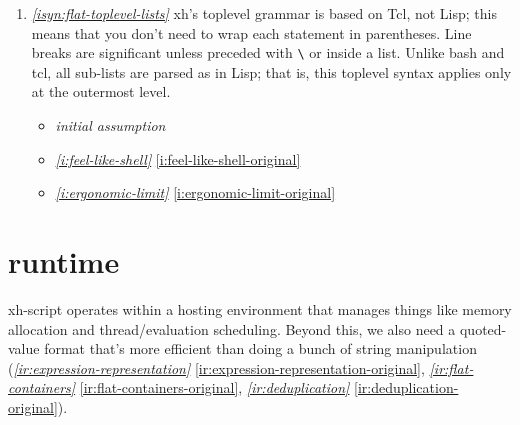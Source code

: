 \documentclass{report}
\makeatletter
\newcommand*{\Label}[2]{%
  \@bsphack
  \begingroup
    \label{#1-original}%
    \def\@currentlabel{#2}%
    \label{#1}%
  \endgroup
  \@esphack
}
\newcommand{\initial}{{\em initial assumption}}
\newcommand{\refboth}[1]{{\em \ref{#1}} \ref{#1-original}}
\makeatother
\begin{document}
\begin{enumerate}
\item{}\Label{isyn:flat-toplevel-lists}{syn.flattoplevel}{\em\ref{isyn:flat-toplevel-lists}}
  xh's toplevel grammar is based on Tcl, not Lisp; this means that you
  don't need to wrap each statement in parentheses. Line breaks are
  significant unless preceded with {\tt \textbackslash} or inside a list.
  Unlike bash and tcl, all sub-lists are parsed as in Lisp; that is, this
  toplevel syntax applies only at the outermost level.
\begin{itemize}
\item \initial
\item \refboth{i:feel-like-shell}
\item \refboth{i:ergonomic-limit}
\end{itemize}
\end{enumerate}

\chapter{runtime}\label{chp:runtime}
  xh-script operates within a hosting environment that manages things like
  memory allocation and thread/evaluation scheduling. Beyond this, we also need
  a quoted-value format that's more efficient than doing a bunch of string
  manipulation (\refboth{ir:expression-representation},
  \refboth{ir:flat-containers}, \refboth{ir:deduplication}).
\end{document}
